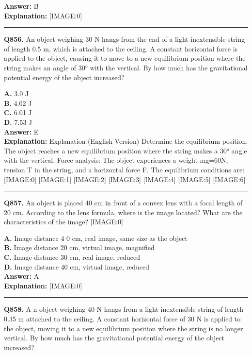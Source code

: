 \documentclass[12pt]{article}
\begin{document}
\textbf{Answer:} B \\
\textbf{Explanation:} [IMAGE:0]

\hrule
\vspace{1em}


\noindent
\textbf{Q856.} An object weighing 30 N hangs from the end of a light inextensible string of length 0.5 m, which is attached to the ceiling. A constant horizontal force is applied to the object, causing it to move to a new equilibrium position where the string makes an angle of 30° with the vertical. By how much has the gravitational potential energy of the object increased?



\textbf{A.} 3.0 J \\
\textbf{B.} 4.02 J \\
\textbf{C.} 6.01 J \\
\textbf{D.} 7.53 J \\

\textbf{Answer:} E \\
\textbf{Explanation:} Explanation (English Version)
Determine the equilibrium position: The object reaches a new equilibrium position where the string makes a 30° angle with the vertical.
Force analysis: The object experiences a weight mg=60N, tension T in the string, and a horizontal force F. The equilibrium conditions are:
[IMAGE:0]
[IMAGE:1]
[IMAGE:2]
[IMAGE:3]
[IMAGE:4]
[IMAGE:5]
[IMAGE:6]

\hrule
\vspace{1em}


\noindent
\textbf{Q857.} An object is placed
40
cm in front of a convex lens with a focal length of
20
cm. According to the lens formula, where is the image located? What are the characteristics of the image?
[IMAGE:0]



\textbf{A.} Image distance
4
0 cm, real image, same size as the object \\
\textbf{B.} Image distance
20
cm, virtual image, magnified \\
\textbf{C.} Image distance 30 cm, real image, reduced \\
\textbf{D.} Image distance
40
cm, virtual image, reduced \\

\textbf{Answer:} A \\
\textbf{Explanation:} [IMAGE:0]

\hrule
\vspace{1em}


\noindent
\textbf{Q858.} A
n object weighing 40 N hangs from a light inextensible string of length 0.35 m attached to the ceiling. A constant horizontal force of 30 N is applied to the object, moving it to a new equilibrium position where the string is no longer vertical. By how much has the gravitational potential energy of the object increased?
\end{document}
